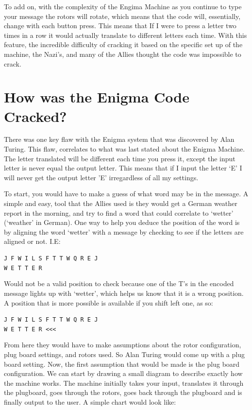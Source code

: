 \documentclass[11pt]{article}
\newcommand\tab[1][0.5cm]{\hspace*{#1}}
\begin{document}
\tab To add on, with the complexity of the Engima Machine as you continue to type your message the rotors will rotate, which means that the code will, essentially, change with each button press. This means that If I were to press a letter two times in a row it would actually translate to different letters each time. With this feature, the incredible difficulty of cracking it based on the specific set up of the machine, the Nazi's, and many of the Allies thought the code was impossible to crack.  

\section{How was the Enigma Code Cracked?}

\tab There was one key flaw with the Enigma system that was discovered by Alan Turing. This flaw, correlates to what was last stated about the Enigma Machine. The letter translated will be different each time you press it, except the input letter is never equal the output letter. This means that if I input the letter `E' I will never get the output letter 'E' irregardless of all my settings. 

\tab To start, you would have to make a guess of what word may be in the message. A simple and easy, tool that the Allies used is they would get a German weather report in the morning, and try to find a word that could correlate to `wetter' (`weather' in German). One way to help you deduce the position of the word is by aligning the word `wetter' with a message by checking to see if the letters are aligned or not. I.E:

\begin{center}
	\texttt{J F W I L S F T T W Q R E J \\
	            W E T T E R}
\end{center}

\tab Would not be a valid position to check because one of the T's in the encoded message lights up with `wetter', which helps us know that it is a wrong position. A position that is more possible is available if you shift left one, as so:

\begin{center}
	\texttt{J F W I L S F T T W Q R E J \\
		W E T T E R  <<<}
\end{center}

\tab From here they would have to make assumptions about the rotor configuration, plug board settings, and rotors used. So Alan Turing would come up with a plug board setting. Now, the first assumption that would be made is the plug board configuration. We can start by drawing a small diagram to describe exactly how the machine works. The machine initially takes your input, translates it through the plugboard, goes through the rotors, goes back through the plugboard and is finally output to the user. A simple chart would look like:
\end{document}
